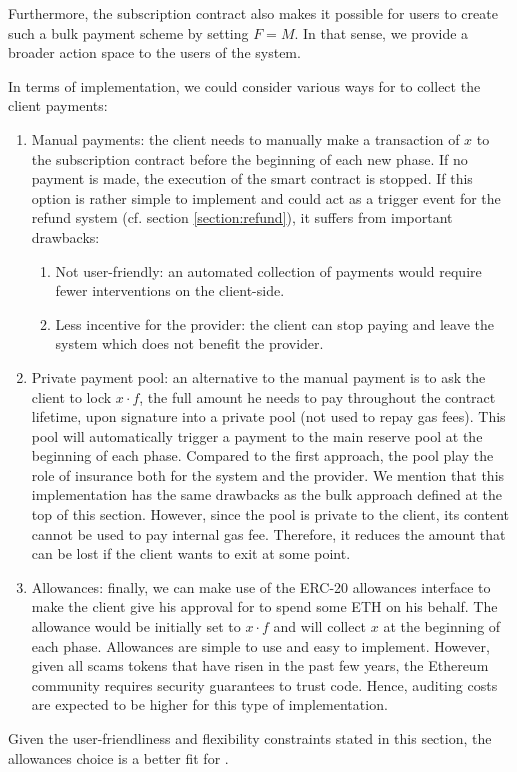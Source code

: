 Furthermore, the {\projectName} subscription contract also makes it possible for users to create such a bulk payment scheme by setting $F = M$. In that sense, we provide a broader action space to the users of the system.

In terms of implementation, we could consider various ways for {\projectName} to collect the client payments:
\begin{enumerate}
    \item Manual payments: the client needs to manually make a transaction of $x$ to the subscription contract before the beginning of each new phase. If no payment is made, the execution of the smart contract is stopped. If this option is rather simple to implement and could act as a trigger event for the refund system (cf. section \ref{section:refund}), it suffers from important drawbacks: 
    \begin{enumerate}
        \item Not user-friendly: an automated collection of payments would require fewer interventions on the client-side.
        \item Less incentive for the provider: the client can stop paying and leave the system which does not benefit the provider.
    \end{enumerate}
    \item Private payment pool: an alternative to the manual payment is to ask the client to lock $x \cdot f$, the full amount he needs to pay throughout the contract lifetime, upon signature into a private pool (not used to repay gas fees). This pool will automatically trigger a payment to the main {\projectName} reserve pool at the beginning of each phase. Compared to the first approach, the pool play the role of insurance both for the system and the provider. We mention that this implementation has the same drawbacks as the bulk approach defined at the top of this section. However, since the pool is private to the client, its content cannot be used to pay internal gas fee. Therefore, it reduces the amount that can be lost if the client wants to exit at some point.
    \item Allowances: finally, we can make use of the ERC-20 allowances interface to make the client give his approval for {\projectName} to spend some ETH on his behalf. The allowance would be initially set to $x \cdot f$ and {\projectName} will collect $x$ at the beginning of each phase. Allowances are simple to use and easy to implement. However, given all scams tokens that have risen in the past few years, the Ethereum community requires security guarantees to trust {\projectName} code. Hence, auditing costs are expected to be higher for this type of implementation.
\end{enumerate}
Given the user-friendliness and flexibility constraints stated in this section, the allowances choice is a better fit for {\projectName}. 

